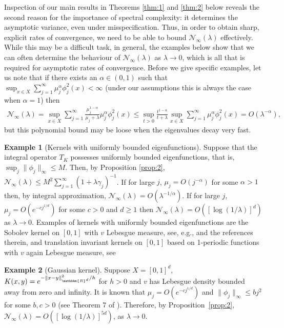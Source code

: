 \documentclass[11pt]{article}
\theoremstyle{definition}
\newtheorem{kernelexampleinner}{Example}
\newenvironment{kernelexample}
  {\begin{kernelexampleinner}}
  {\end{kernelexampleinner}}
\theoremstyle{remark}
\begin{document}
Inspection of our main results in Theorems \ref{thm:1} and \ref{thm:2} below reveals the second reason for the importance of spectral complexity: it determines the asymptotic variance, even under misspecification. Thus, in order to obtain sharp, explicit rates of convergence, we need to be able to bound $\mathcal{N}_{\infty}(\lambda)$ effectively. While this may be a difficult task, in general, the examples below show that we can often determine the behaviour of $\mathcal{N}_{\infty}(\lambda)$ as $\lambda \to 0$, which is all that is required for asymptotic rates of convergence. Before we give specific examples, let us note that if there exists an $\alpha \in (0,1)$ such that $\sup_{x \in X}\sum_{j=1}^{\infty} \mu_j^{\alpha} \phi_j^2(x)<\infty$ (under our assumptions this is always the case when $\alpha=1$) then
\begin{align*}
\mathcal{N}_{\infty}(\lambda) = \sup_{x \in X} \sum_{j=1}^\infty \frac{\mu_j^{1-\alpha}}{\mu_j+\lambda} \mu_j^{\alpha} \phi_j^2(x) \leq \sup_{t>0} \frac{t^{1-\alpha}}{t+\lambda} \sup_{x \in X} \sum_{j=1}^{\infty} \mu_j^{\alpha} \phi_j^2(x) = O(\lambda^{-\alpha}),
\end{align*}
but this polynomial bound may be loose when the eigenvalues decay very fast.

\begin{kernelexample}[Kernels with uniformly bounded eigenfunctions] Suppose that the integral operator $T_K$ possesses uniformly bounded eigenfunctions, that is, $\sup_j \|\phi_j\|_{\infty} \leq M$. Then, by Proposition \ref{prop:2}, $\mathcal{N}_{\infty}(\lambda) \leq M^2\sum_{j=1}^{\infty} (1+\lambda \gamma_j)^{-1}$. If for large $j$, $\mu_j =O(j^{-\alpha})$ for some $\alpha>1$ then, by integral approximation, $\mathcal{N}_{\infty}(\lambda) = O(\lambda^{-1/\alpha})$. If for large $j$, $\mu_j =O( e^{-c j^{1/d}})$ for some $c>0$ and $d \geq 1$ then $\mathcal{N}_{\infty}(\lambda) = O([\log(1/\lambda)]^d)$ as $\lambda \to 0$. Examples of kernels with uniformly bounded eigenfunctions are the Sobolev kernel on $[0,1]$ with $v$ Lebesgue measure, see, e.g., \citep[p. 60]{Hsing:2015} and the references therein, and translation invariant kernels on $[0,1]$ based on 1-periodic functions with $v$ again Lebesgue measure, see \citep[pp. 397--398]{Wain:2019}
\end{kernelexample}

\begin{kernelexample}[Gaussian kernel] Suppose $X = [0,1]^d$, $K(x,y) = e^{-\|x-y\|_{\mathbbm{R}^d}^2/h}$ for $h>0$ and $v$ has Lebesgue density bounded away from zero and infinity. It is known that $\mu_j = O( e^{-c j^{1/d}})$ and $\|\phi_j\|_{\infty} \leq b j^2$ for some $b,c>0$ (see Theorem 7 of \citep{Dommel:2025}). Therefore, by Proposition~\ref{prop:2}, $\mathcal{N}_{\infty}(\lambda) = O([\log(1/\lambda)]^{5d})$, as $\lambda \to 0$.
\end{kernelexample}
\end{document}
